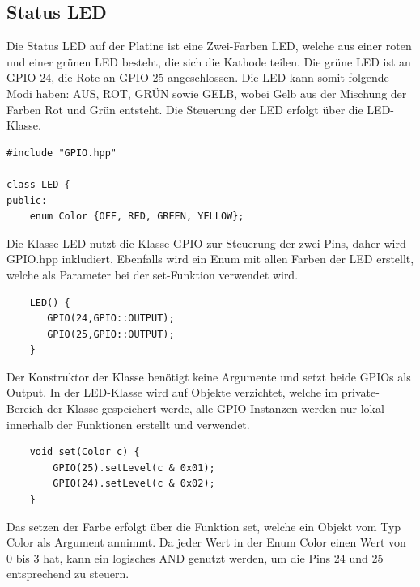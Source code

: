 \documentclass[12pt]{article}
\begin{document}
\subsection{Status LED}
Die Status LED auf der Platine ist eine Zwei-Farben LED, welche aus einer roten und einer grünen LED besteht, die sich die Kathode teilen. Die grüne LED ist an GPIO 24, die Rote an GPIO 25 angeschlossen. Die LED kann somit folgende Modi haben: AUS, ROT, GRÜN sowie GELB, wobei Gelb aus der Mischung der Farben Rot und Grün entsteht. Die Steuerung der LED erfolgt über die LED-Klasse.\\
\begin{verbatim}
#include "GPIO.hpp"

class LED {
public:
    enum Color {OFF, RED, GREEN, YELLOW};
\end{verbatim}
Die Klasse LED nutzt die Klasse GPIO zur Steuerung der zwei Pins, daher wird GPIO.hpp inkludiert. Ebenfalls wird ein Enum mit allen Farben der LED erstellt, welche als Parameter bei der set-Funktion verwendet wird.\\
\begin{verbatim}
    LED() {
       GPIO(24,GPIO::OUTPUT);
       GPIO(25,GPIO::OUTPUT);
    }
\end{verbatim}
Der Konstruktor der Klasse benötigt keine Argumente und setzt beide GPIOs als Output. In der LED-Klasse wird auf Objekte verzichtet, welche im private-Bereich der Klasse gespeichert werde, alle GPIO-Instanzen werden nur lokal innerhalb der Funktionen erstellt und verwendet.\\
\begin{verbatim}
    void set(Color c) {
        GPIO(25).setLevel(c & 0x01);
        GPIO(24).setLevel(c & 0x02);
    }
\end{verbatim}
Das setzen der Farbe erfolgt über die Funktion set, welche ein Objekt vom Typ Color als Argument annimmt. Da jeder Wert in der Enum Color einen Wert von 0 bis 3 hat, kann ein logisches AND genutzt werden, um die Pins 24 und 25 entsprechend zu steuern.
\end{document}
